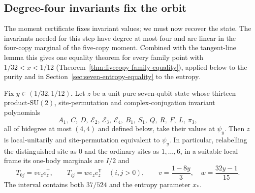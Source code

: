 \subsection{Degree-four invariants fix the orbit}\label{sec:fivecopy-orbit}
The moment certificate fixes invariant values; we must now recover the state. The invariants needed for this
step have degree at most four and are linear in the four-copy marginal of the five-copy moment. Combined with the tangent-line lemma this gives one
equality theorem for every family point with $1/32<x<1/12$ (Theorem~\ref{thm:fivecopy-family-equality}), applied below to the
purity and in Section~\ref{sec:seven-entropy-equality} to the entropy.

\begin{theorem}
\label{thm:moment-orbit-rigidity}
Fix $y\in(1/32,1/12)$. Let $z$ be a unit pure seven-qubit state whose thirteen
product-$\mathrm{SU}(2)$, site-permutation and complex-conjugation invariant polynomials
\[
 A_1,\ C,\ D,\ \mathcal E_2,\ \mathcal E_3,\ \mathcal E_4,\ B_1,\ S_1,\ Q,\ R,\ F,\ L,\ \pi_3,
\]
all of bidegree at most $(4,4)$ and defined below, take their values at $\psi_y$.
Then $z$ is local-unitarily and site-permutation equivalent to $\psi_y$.
In particular, relabelling the distinguished site as $0$ and the ordinary sites as $1,\ldots,6$,
in a suitable local frame its one-body marginals are $I/2$ and
\[
 T_{0j}=v e_ze_z^{\mathsf T},\qquad T_{ij}=w e_ze_z^{\mathsf T}\quad(i,j>0),
 \qquad v=\frac{1-8y}{3},\quad w=\frac{32y-1}{15}.
\]
The interval contains both $37/524$ and the entropy parameter $x_*$.
\end{theorem}

